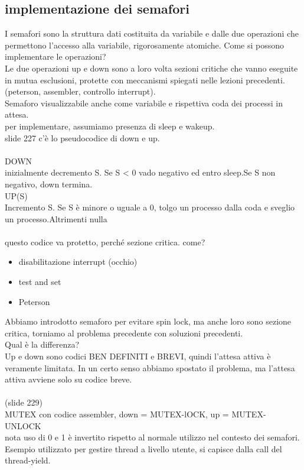 \documentclass{article}
\begin{document}
\subsection{implementazione dei semafori}
I semafori sono la struttura dati costituita da variabile e dalle due operazioni che permettono l'accesso alla variabile, rigorosamente atomiche. Come si possono implementare le operazioni?\\
Le due operazioni up e down sono a loro volta sezioni critiche che vanno eseguite in mutua esclusioni, protette con meccanismi spiegati nelle lezioni precedenti. (peterson, assembler, controllo interrupt). \\
Semaforo visualizzabile anche come variabile e rispettiva coda dei processi in attesa.\\
per implementare, assumiamo presenza di sleep e wakeup.\\
slide 227 c'è lo pseudocodice di down e up.\\
\\
DOWN\\
inizialmente decremento S. Se S < 0 vado negativo ed entro sleep.Se S non negativo, down termina.\\
UP(S)\\
Incremento S. Se S è minore o uguale a 0, tolgo un processo dalla coda e sveglio un processo.Altrimenti nulla\\
\\
questo codice va protetto, perché sezione critica. come?
\begin{itemize}
    \item disabilitazione interrupt (occhio)
    \item test and set
    \item Peterson
\end{itemize}

Abbiamo introdotto semaforo per evitare spin lock, ma anche loro sono sezione critica, torniamo al problema precedente con soluzioni precedenti.\\
Qual è la differenza?\\
Up e down sono codici BEN DEFINITI e BREVI, quindi l'attesa attiva è veramente limitata. In un certo senso abbiamo spostato il problema, ma l'attesa attiva avviene solo su codice breve.\\
\\
(slide 229)\\
MUTEX con codice assembler, down = MUTEX-lOCK, up = MUTEX-UNLOCK\\
nota uso di 0 e 1 è invertito rispetto al normale utilizzo nel contesto dei semafori.\\
Esempio utilizzato per gestire thread a livello utente, si capisce dalla call del thread-yield.
\end{document}
